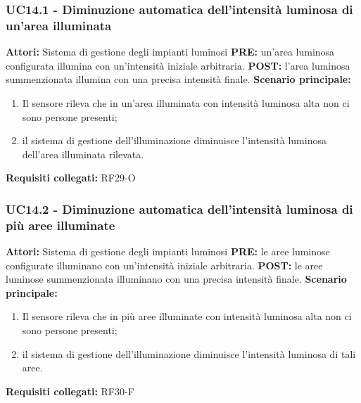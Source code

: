\documentclass[a4paper, 12pt]{article}
\begin{document}
\subsubsection{UC14.1 - Diminuzione automatica dell'intensità luminosa di un'area illuminata}
\textbf{Attori:} Sistema di gestione degli impianti luminosi \newline
\textbf{PRE:} un'area luminosa configurata illumina con un'intensità iniziale arbitraria.\newline
\textbf{POST:} l'area luminosa summenzionata illumina con una precisa intensità finale.\newline
\textbf{Scenario principale:}
\begin{enumerate}
    \item Il sensore rileva che in un'area illuminata con intensità luminosa alta non ci sono persone presenti;
    \item il sistema di gestione dell'illuminazione diminuisce l'intensità luminosa dell'area illuminata rilevata.
\end{enumerate}
\textbf{Requisiti collegati:} RF29-O\newline

\subsubsection{UC14.2 - Diminuzione automatica dell'intensità luminosa di più aree illuminate}
\textbf{Attori:} Sistema di gestione degli impianti luminosi \newline
\textbf{PRE:} le aree luminose configurate illuminano con un'intensità iniziale arbitraria.\newline
\textbf{POST:} le aree luminose summenzionata illuminano con una precisa intensità finale.\newline
\textbf{Scenario principale:}
\begin{enumerate}
    \item Il sensore rileva che in più aree illuminate con intensità luminosa alta non ci sono persone presenti;
    \item il sistema di gestione dell'illuminazione diminuisce l'intensità luminosa di tali aree.
\end{enumerate}
\textbf{Requisiti collegati:} RF30-F\newline
\end{document}
